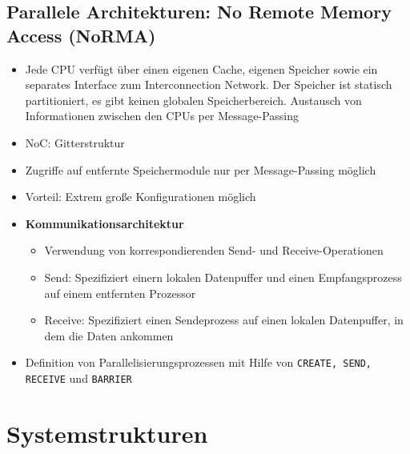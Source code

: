 \subsection{Parallele Architekturen: No Remote Memory Access (NoRMA)}
\begin{itemize}
	\item Jede CPU verfügt über einen eigenen Cache, eigenen Speicher sowie ein separates Interface zum Interconnection Network. Der Speicher ist statisch partitioniert, es gibt keinen globalen Speicherbereich. Austausch von Informationen zwischen den CPUs per Message-Passing
	\item NoC: Gitterstruktur
	\item Zugriffe auf entfernte Speichermodule nur per Message-Passing möglich
	\item Vorteil: Extrem große Konfigurationen möglich
	\item \textbf{Kommunikationsarchitektur}
	\begin{itemize}
		\item Verwendung von korrespondierenden Send- und Receive-Operationen
		\item Send: Spezifiziert einern lokalen Datenpuffer und einen Empfangsprozess auf einem entfernten Prozessor
		\item Receive: Spezifiziert einen Sendeprozess auf einen lokalen Datenpuffer, in dem die Daten ankommen
	\end{itemize}
	\item Definition von Parallelisierungsprozessen mit Hilfe von \texttt{CREATE, SEND, RECEIVE} und \texttt{BARRIER}
\end{itemize}



\section{Systemstrukturen}
